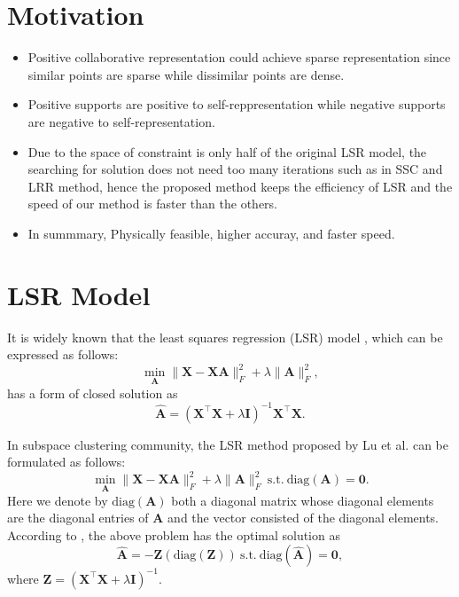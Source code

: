 \documentclass[10pt,twocolumn,letterpaper]{article}
\begin{document}
\section{Motivation}

\begin{itemize}
\item Positive collaborative representation could achieve sparse representation since similar points are sparse while dissimilar points are dense.

\item Positive supports are positive to self-reppresentation while negative supports are negative to self-representation.

\item Due to the space of constraint is only half of the original LSR model, the searching for solution does not need too many iterations such as in SSC and LRR method, hence the proposed method keeps the efficiency of LSR and the speed of our method is faster than the others.

\item In summmary, Physically feasible, higher accuray, and faster speed.
\end{itemize}

\section{LSR Model}
It is widely known that the least squares regression (LSR) model \cite{prml}, which can be expressed as follows:
\begin{equation}
\label{e1}
\min_{\bm{A}}
\|
\bm{X}
-
\bm{X}\bm{A}
\|_{F}^{2}
+
\lambda
\|
\bm{A}
\|_{F}^{2}
,
\end{equation}
has a form of closed solution as
\begin{equation}
\label{e2}
\hat{\bm{A}}
=
(\bm{X}^{\top}\bm{X}+\lambda\bm{I})^{-1}\bm{X}^{\top}\bm{X}.
\end{equation}


In subspace clustering community, the LSR method \cite{lsr} proposed by Lu et al. can be formulated as follows:
\begin{equation}
\label{e3}
\min_{\bm{A}}
\|
\bm{X}
-
\bm{X}\bm{A}
\|_{F}^{2}
+
\lambda
\|
\bm{A}
\|_{F}^{2}
\ 
\text{s.t.}
\ 
\text{diag}(\bm{A})=\bm{0}.
\end{equation}
Here we denote by $\text{diag}(\bm{A})$ both a diagonal matrix whose diagonal elements are the diagonal entries of $\bm{A}$ and the vector consisted of the diagonal elements. According to \cite{lsr}, the above problem has the optimal solution as 
\begin{equation}
\label{e4}
\hat{\bm{A}}
=
-\bm{\bm{Z}}(\text{diag}(\bm{Z}))
\
\text{s.t.} 
\
\text{diag}(\hat{\bm{A}})=\bm{0}
,
\end{equation}
where $\bm{Z}=(\bm{X}^{\top}\bm{X}+\lambda\bm{I})^{-1}$.
\end{document}
